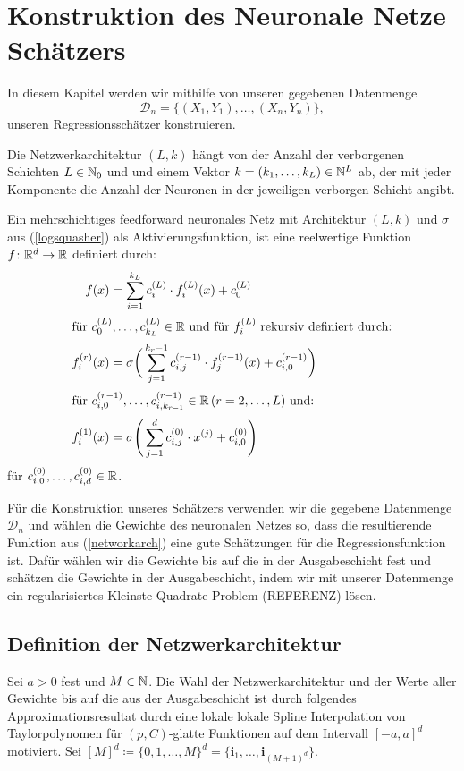 \chapter{Konstruktion des Neuronale Netze Schätzers}
\label{chap:2}

In diesem Kapitel werden wir mithilfe von unseren gegebenen Datenmenge 
$$ \mathcal{D}_n = \{(X_1, Y_1),\dots,(X_n, Y_n)\},$$
unseren Regressionsschätzer konstruieren. 

Die Netzwerkarchitektur $(L, k)$ hängt von der Anzahl der verborgenen Schichten $L \in \mathbb{N}_0$ und und einem Vektor $k = (k_1,\dots,k_L) \in \mathbb{N}^L$ ab, der mit jeder Komponente die Anzahl der Neuronen in der jeweiligen verborgen Schicht angibt. 

Ein mehrschichtiges feedforward neuronales Netz mit Architektur $(L, k)$ und $\sigma$ aus (\ref{logsquasher}) als Aktivierungsfunktion, ist eine reelwertige Funktion $f\colon \mathbb{R}^d \to \mathbb{R}$ definiert durch:
\begin{align}
\label{networkarch}
f(x) & = \sum_{i = 1}^{k_L} c_i^{(L)} \cdot f_i^{(L)}(x) + c_0^{(L)} \nonumber \\
\intertext{für $c_0^{(L)},\dots,c_{k_L}^{(L)} \in \mathbb{R}$ und für $f_i^{(L)}$ rekursiv definiert durch:} 
f_i^{(r)}(x) & = \sigma \bigg(\sum_{j = 1}^{k_r - 1} c_{i,j}^{(r - 1)} \cdot f_j^{(r - 1)}(x) + c_{i,0}^{(r - 1)} \bigg)\\
\intertext{für $c_{i,0}^{(r - 1)},\dots,c_{i,k_{r - 1}}^{(r - 1)} \in \mathbb{R} \,(r = 2,\dots, L)$ und:}
f_i^{(1)}(x) & = \sigma \Bigg(\sum_{j = 1}^{d} c_{i,j}^{(0)} \cdot x^{(j)} + c_{i,0}^{(0)} \Bigg) \nonumber
\end{align} 
für $c_{i,0}^{(0)},\dots,c_{i,d}^{(0)} \in \mathbb{R}$.


Für die Konstruktion unseres Schätzers verwenden wir die gegebene Datenmenge $\mathcal{D}_n$ und wählen die Gewichte des neuronalen Netzes so, dass die resultierende Funktion aus (\ref{networkarch}) eine gute Schätzungen für die Regressionsfunktion ist. Dafür wählen wir die Gewichte bis auf die in der Ausgabeschicht fest und schätzen die Gewichte in der Ausgabeschicht, indem wir mit unserer Datenmenge ein regularisiertes Kleinste-Quadrate-Problem (REFERENZ) lösen.

\section{Definition der Netzwerkarchitektur}
Sei $a > 0$ fest und $M \in \mathbb{N}$. Die Wahl der Netzwerkarchitektur und der Werte aller Gewichte bis auf die aus der Ausgabeschicht ist durch folgendes Approximationsresultat durch eine lokale lokale Spline Interpolation von Taylorpolynomen für $(p,C)$-glatte Funktionen auf dem Intervall $[-a, a]^d$ motiviert.
Sei $[M]^d \coloneqq\{0, 1, \dots, M\}^d = \{\mathbf{i}_1,\dots, \mathbf{i}_{(M + 1)^d}\}.$ 

